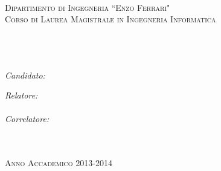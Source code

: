 \documentclass[11pt, oneside]{Thesis} %
\begin{document}
\begin{titlepage}

\begin{center}
\textsc{\Large \bf \univname}\\[0.5cm] %
\textsc{\large Dipartimento di Ingegneria ``Enzo Ferrari"}\\[0.2cm] %
\textsc{\large Corso di Laurea Magistrale in Ingegneria Informatica}\\[5.5cm] %

\HRule \\[0.6cm] %
{\huge \bfseries \ttitle}\\[0.4cm] %
\HRule \\[1.5cm] %
 
\begin{minipage}{0.4\textwidth}
\begin{flushleft} \large
\emph{Candidato:}\\
\authornames %
\end{flushleft}
\end{minipage}
\begin{minipage}{0.4\textwidth}
\begin{flushright} \large
\emph{Relatore:} \\
\supname \\ %
\emph{Correlatore:} \\
\cosupname \\ %
\end{flushright}
\end{minipage}\\[5.5cm]
 
 
\textsc{\large Anno Accademico 2013-2014}\\[4cm] %
 
\vfill
\end{center}

\end{titlepage}
\end{document}

